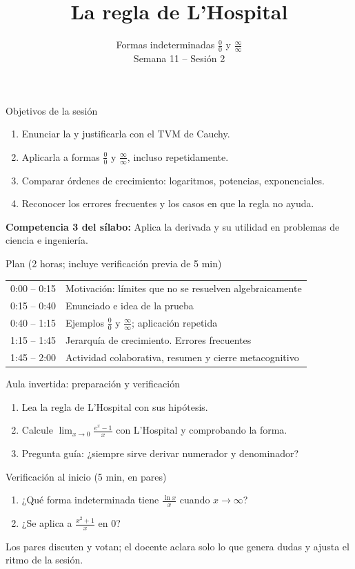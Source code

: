 \documentclass[10pt,aspectratio=169]{beamer}
\title[Regla de L'Hospital]{La regla de L'Hospital}
\subtitle{Formas indeterminadas $\frac00$ y $\frac\infty\infty$\\[2pt]\small Semana 11 -- Sesión 2}
\begin{document}
\begin{frame}
  \titlepage
\end{frame}

\begin{frame}{Objetivos de la sesión}
  \begin{enumerate}
    \item Enunciar la  y justificarla con el TVM de Cauchy.
    \item Aplicarla a formas $\frac00$ y $\frac\infty\infty$, incluso repetidamente.
    \item Comparar órdenes de crecimiento: logaritmos, potencias, exponenciales.
    \item Reconocer los errores frecuentes y los casos en que la regla no ayuda.
  \end{enumerate}
  \vspace{1mm}
  {\small\textbf{Competencia 3 del sílabo:} Aplica la derivada y su utilidad en problemas de ciencia e ingeniería.}
  \begin{block}{Plan (2 horas; incluye verificación previa de 5 min)}
    \begin{tabular}{ll}
      0:00 -- 0:15 & Motivación: límites que no se resuelven algebraicamente\\
      0:15 -- 0:40 & Enunciado e idea de la prueba\\
      0:40 -- 1:15 & Ejemplos $\frac00$ y $\frac\infty\infty$; aplicación repetida\\
      1:15 -- 1:45 & Jerarquía de crecimiento. Errores frecuentes\\
      1:45 -- 2:00 & Actividad colaborativa, resumen y cierre metacognitivo
    \end{tabular}
  \end{block}
\end{frame}

\begin{frame}{Aula invertida: preparación y verificación}
  \small
  \begin{previa}
    \begin{enumerate}
      \item Lea la regla de L'Hospital con sus hipótesis.
      \item Calcule $\lim_{x\to0}\frac{e^x-1}{x}$ con L'Hospital y comprobando la forma.
      \item Pregunta guía: ¿siempre sirve derivar numerador y denominador?
    \end{enumerate}
  \end{previa}
  \begin{block}{Verificación al inicio (5 min, en pares)}
    \begin{enumerate}
      \item ¿Qué forma indeterminada tiene $\frac{\ln x}{x}$ cuando $x\to\infty$?
      \item ¿Se aplica a $\frac{x^2+1}{x}$ en $0$?
    \end{enumerate}
    Los pares discuten y votan; el docente aclara solo lo que genera dudas y ajusta el ritmo de la sesión.
  \end{block}
\end{frame}
\end{document}
